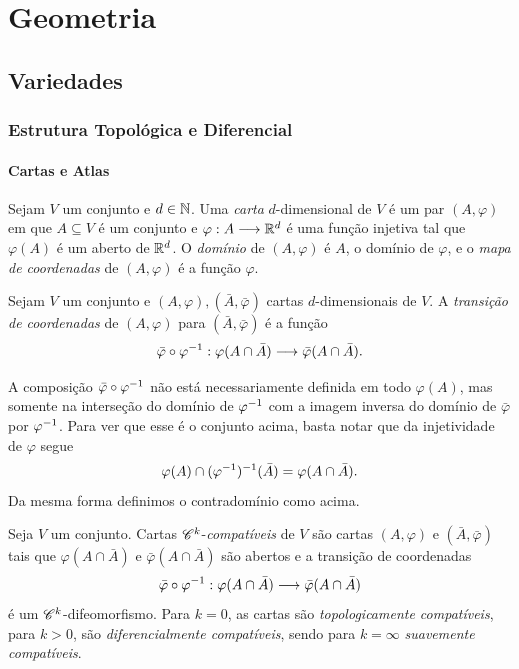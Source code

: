 \part{Geometria}

\chapter{Variedades}

\section{Estrutura Topológica e  Diferencial}

\subsection{Cartas e Atlas}

\begin{defi}
Sejam $V$ um conjunto e $d \in \mathbb{N}$. Uma \emph{carta} $d$-dimensional de $V$ é um par $(A,\varphi)$ em que $A \subseteq V$ é um conjunto e $\varphi: A \longrightarrow \mathbb{R}^d$ é uma função injetiva tal que $\varphi(A)$ é um aberto de $\mathbb{R}^d$. O \emph{domínio} de $(A,\varphi)$ é $A$, o domínio de $\varphi$, e o \emph{mapa de coordenadas} de $(A,\varphi)$ é a função $\varphi$.
\end{defi}

\begin{defi}
Sejam $V$ um conjunto e $(A,\varphi),(\bar A,\bar\varphi)$ cartas $d$-dimensionais de $V$. A \emph{transição de coordenadas} de $(A,\varphi)$ para $(\bar A,\bar\varphi)$ é a função
	\begin{equation*}
	\bar\varphi \circ \varphi^{-1}: \varphi(A \cap \bar A) \longrightarrow \bar\varphi(A \cap \bar A).
	\end{equation*}
\end{defi}

A composição $\bar\varphi \circ \varphi^{-1}$ não está necessariamente definida em todo $\varphi(A)$, mas somente na interseção do domínio de $\varphi^{-1}$ com a imagem inversa do domínio de $\bar\varphi$ por $\varphi^{-1}$. Para ver que esse é o conjunto acima, basta notar que da injetividade de $\varphi$ segue
	\begin{equation*}
	\varphi(A) \cap (\varphi^{-1})^{-1}(\bar A) = \varphi(A \cap \bar A).
	\end{equation*}
Da mesma forma definimos o contradomínio como acima.

\begin{defi}
Seja $V$ um conjunto. Cartas $\mathscr{C}^k$-\emph{compatíveis} de $V$ são cartas $(A,\varphi)$ e $(\bar A,\bar\varphi)$ tais que $\varphi(A \cap \bar A)$ e $\bar\varphi(A \cap \bar A)$ são abertos e a transição de coordenadas
	\begin{equation*}
	\bar\varphi \circ \varphi^{-1}: \varphi(A \cap \bar A) \longrightarrow \bar\varphi(A \cap \bar A)
	\end{equation*}
é um $\mathscr{C}^k$-difeomorfismo. Para $k=0$, as cartas são \emph{topologicamente compatíveis}, para $k>0$, são \emph{diferencialmente compatíveis}, sendo para $k=\infty$ \emph{suavemente compatíveis}.
\end{defi}

